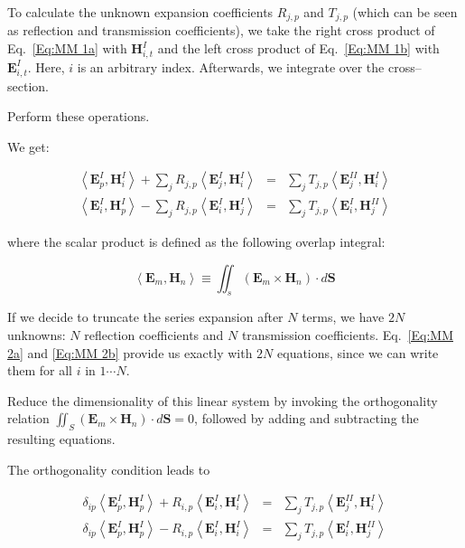 To calculate the unknown expansion coefficients $R_{j,p}$ and $T_{j,p}$ (which can be seen as reflection and transmission coefficients), we take the right cross product of Eq.~\ref{Eq:MM 1a} with $\mathbf{H}^{I}_{i,t}$ and the left cross product of Eq.~\ref{Eq:MM 1b} with $\mathbf{E}^{I}_{i,t}$. Here, $i$ is an arbitrary index. Afterwards, we integrate over the cross--section.

\begin{cue}
  Perform these operations.
\end{cue}

We get:

\begin{eqnarray}
\left\langle \mathbf{E}^{I}_{p},\mathbf{H}^{I}_{i}\right\rangle +\sum _{j}R_{j,p}\left\langle \mathbf{E}^{I}_{j},\mathbf{H}^{I}_{i}\right\rangle  & = & \sum _{j}T_{j,p}\left\langle \mathbf{E}^{II}_{j},\mathbf{H}^{I}_{i}\right\rangle \label{Eq:MM 2a} \\
\left\langle \mathbf{E}^{I}_{i},\mathbf{H}^{I}_{p}\right\rangle -\sum _{j}R_{j,p}\left\langle \mathbf{E}^{I}_{i},\mathbf{H}^{I}_{j}\right\rangle  & = & \sum _{j}T_{j,p}\left\langle \mathbf{E}^{I}_{i},\mathbf{H}^{II}_{j}\right\rangle \label{Eq:MM 2b} 
\end{eqnarray}

where the scalar product is defined as the following overlap integral:

\begin{equation} 
\left\langle \mathbf{E}_{m},\mathbf{H}_{n}\right\rangle \equiv \iint _{s}\left( \mathbf{E}_{m}\times \mathbf{H}_{n}\right) \cdot d{\mathbf S}
\end{equation} 

If we decide to truncate the series expansion after $N$ terms, we have $2N$ unknowns: $N$ reflection coefficients and $N$ transmission coefficients. Eq.~\ref{Eq:MM 2a} and \ref{Eq:MM 2b} provide us exactly with $2N$ equations, since we can write them for all $i$ in $1 \cdots N$.

\begin{cue}
Reduce the dimensionality of this linear system by invoking the orthogonality relation $\iint_{S}\left( \mathbf{E}_{m}\times \mathbf{H}_{n}\right) \cdot d{\mathbf S}=0$, followed by adding and subtracting the resulting equations.
\end{cue}

The orthogonality condition leads to
  
\begin{eqnarray}
\delta _{ip}\left\langle \mathbf{E}^{I}_{p},\mathbf{H}^{I}_{p}\right\rangle +R_{i,p}\left\langle \mathbf{E}^{I}_{i},\mathbf{H}^{I}_{i}\right\rangle  & = & \sum _{j}T_{j,p}\left\langle \mathbf{E}^{II}_{j},\mathbf{H}^{I}_{i}\right\rangle \label{Eq:MM 3a} \\
\delta _{ip}\left\langle \mathbf{E}^{I}_{p},\mathbf{H}^{I}_{p}\right\rangle -R_{i,p}\left\langle \mathbf{E}^{I}_{i},\mathbf{H}^{I}_{i}\right\rangle  & = & \sum _{j}T_{j,p}\left\langle \mathbf{E}^{I}_{i},\mathbf{H}^{II}_{j}\right\rangle \label{Eq:MM 3b} 
\end{eqnarray}

